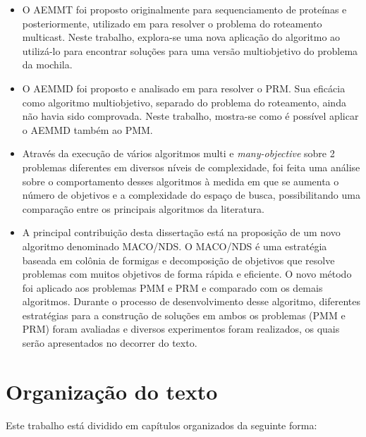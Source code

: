 \begin{itemize}  
	\item O \ac{AEMMT} foi proposto originalmente para sequenciamento de proteínas \cite{Brasil2013} e posteriormente, utilizado em  \cite{Lafeta2016} para resolver o problema do roteamento multicast. Neste trabalho, explora-se uma nova aplicação do algoritmo ao utilizá-lo para encontrar soluções para uma versão multiobjetivo do problema da mochila.
	\item O \ac{AEMMD} foi proposto e analisado em \cite{Lafeta2016} para resolver o \ac{PRM}. Sua eficácia como algoritmo multiobjetivo, separado do problema do roteamento, ainda não havia sido comprovada. Neste trabalho, mostra-se como é possível aplicar o \ac{AEMMD} também ao \ac{PMM}.
	\item Através da execução de vários algoritmos multi e \textit{many-objective} sobre 2 problemas diferentes em diversos níveis de complexidade, foi feita uma análise sobre o comportamento desses algoritmos à medida em que se aumenta o número de objetivos e a complexidade do espaço de busca, possibilitando uma comparação entre os principais algoritmos da literatura.
	\item A principal contribuição desta dissertação está na proposição de um novo algoritmo denominado \ac{MACO/NDS}. O \ac{MACO/NDS} é uma estratégia baseada em colônia de formigas e decomposição de objetivos que resolve problemas com muitos objetivos de forma rápida e eficiente. O novo método foi aplicado aos problemas \ac{PMM} e \ac{PRM} e comparado com os demais algoritmos. Durante o processo de desenvolvimento desse algoritmo, diferentes estratégias para a construção de soluções em ambos os problemas (PMM e PRM) foram avaliadas e diversos experimentos foram realizados, os quais serão apresentados no decorrer do texto.
\end{itemize}

\section{Organização do texto}
Este trabalho está dividido em capítulos organizados da seguinte forma:


